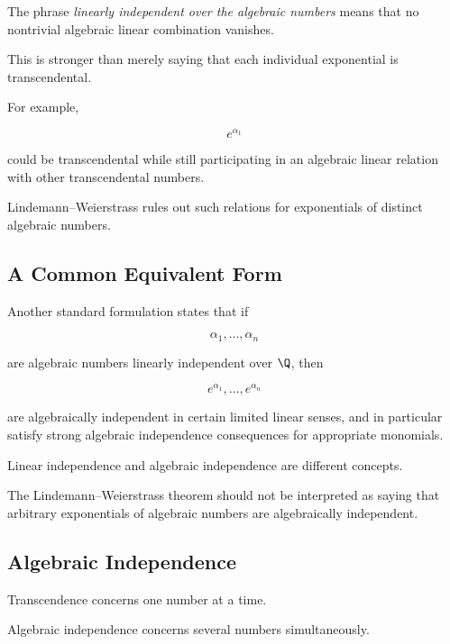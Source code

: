 The phrase \emph{linearly independent over the algebraic numbers} means that
no nontrivial algebraic linear combination vanishes.

This is stronger than merely saying that each individual exponential is
transcendental.

For example,

\[ e^{\alpha_1} \]

could be transcendental while still participating in an algebraic linear
relation with other transcendental numbers.

Lindemann--Weierstrass rules out such relations for exponentials of distinct
algebraic numbers.

\subsection{A Common Equivalent Form}
\label{subsec:lindemann-weierstrass-equivalent-form}

Another standard formulation states that if

\[ \alpha_1,\ldots,\alpha_n \]

are algebraic numbers linearly independent over \(\Q\), then

\[ e^{\alpha_1},\ldots,e^{\alpha_n} \]

are algebraically independent in certain limited linear senses, and in
particular satisfy strong algebraic independence consequences for
appropriate monomials.

\begin{warningbox}
Linear independence and algebraic independence are different concepts.

The Lindemann--Weierstrass theorem should not be interpreted as saying that
arbitrary exponentials of algebraic numbers are algebraically independent.
\end{warningbox}

\subsection{Algebraic Independence}
\label{subsec:algebraic-independence}

Transcendence concerns one number at a time.

Algebraic independence concerns several numbers simultaneously.

